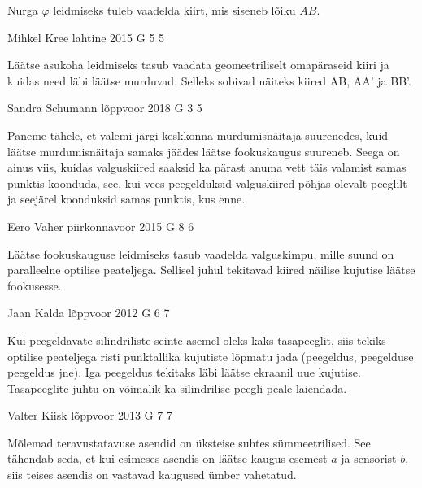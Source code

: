 \documentclass[11pt]{article}
\begin{document}
{{\ifHint
Nurga $\varphi$ leidmiseks tuleb vaadelda kiirt, mis siseneb lõiku $AB$.
\fi
}

{Mihkel Kree} %
{lahtine} %
{2015} %
{G 5} %
{5} %
{

\ifHint
Läätse asukoha leidmiseks tasub vaadata geomeetriliselt omapäraseid kiiri ja kuidas need läbi läätse murduvad. Selleks sobivad näiteks kiired AB, AA' ja BB'.
\fi
}

{Sandra Schumann} %
{lõppvoor} %
{2018} %
{G 3} %
{5} %
{

\ifHint
Paneme tähele, et valemi järgi keskkonna murdumisnäitaja suurenedes, kuid läätse murdumisnäitaja samaks jäädes läätse fookuskaugus suureneb. Seega on ainus viis, kuidas valguskiired saaksid ka pärast anuma vett täis valamist samas punktis koonduda, see, kui vees peegelduksid valguskiired põhjas olevalt peeglilt ja seejärel koonduksid samas punktis, kus enne.
\fi
}

{Eero Vaher} %
{piirkonnavoor} %
{2015} %
{G 8} %
{6} %
{

\ifHint
Läätse fookuskauguse leidmiseks tasub vaadelda valguskimpu, mille suund on paralleelne optilise peateljega. Sellisel juhul tekitavad kiired näilise kujutise läätse fookusesse.
\fi
}

{Jaan Kalda} %
{lõppvoor} %
{2012} %
{G 6} %
{7} %
{

\ifHint
Kui peegeldavate silindriliste seinte asemel oleks kaks tasapeeglit, siis
tekiks optilise peateljega risti punktallika kujutiste lõpmatu jada (peegeldus, peegelduse peegeldus jne). Iga peegeldus tekitaks läbi läätse ekraanil uue kujutise. Tasapeeglite juhtu on võimalik ka silindrilise peegli peale laiendada.
\fi
}

{Valter Kiisk} %
{lõppvoor} %
{2013} %
{G 7} %
{7} %
{

\ifHint
Mõlemad teravustatavuse asendid on üksteise suhtes sümmeetrilised. See tähendab seda, et kui esimeses asendis on läätse kaugus esemest $a$ ja sensorist $b$, siis teises asendis on vastavad kaugused ümber vahetatud.
\fi
}

}
\end{document}
